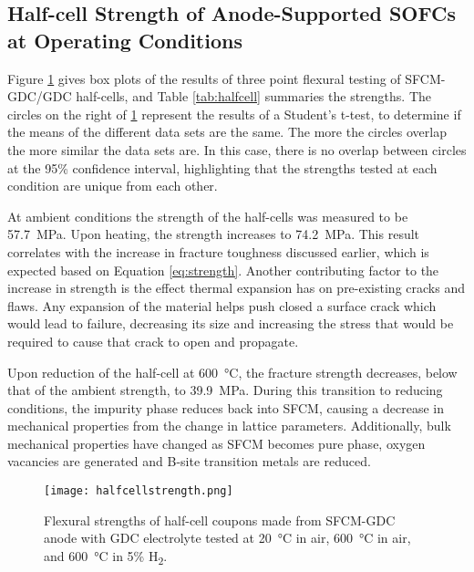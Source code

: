     \subsection{Half-cell Strength of Anode-Supported SOFCs at Operating Conditions}
        Figure \ref{fig:InSituBox} gives box plots of the results of three point flexural testing of SFCM-GDC/GDC half-cells, and Table \ref{tab:halfcell} summaries the strengths.
        The circles on the right of \ref{fig:InSituBox} represent the results of a Student's t-test, to determine if the means of the different data sets are the same.
        The more the circles overlap the more similar the data sets are.
        In this case, there is no overlap between circles at the 95\% confidence interval, highlighting that the strengths tested at each condition are unique from each other.

        At ambient conditions the strength of the half-cells was measured to be \SI{57.7}{\mega\pascal}.
        Upon heating, the strength increases to \SI{74.2}{\mega\pascal}.
        This result correlates with the increase in fracture toughness discussed earlier, which is expected based on Equation \ref{eq:strength}.
        Another contributing factor to the increase in strength is the effect thermal expansion has on pre-existing cracks and flaws.
        Any expansion of the material helps push closed a surface crack which would lead to failure, decreasing its size and increasing the stress that would be required to cause that crack to open and propagate.

        Upon reduction of the half-cell at \SI{600}{\celsius}, the fracture strength decreases, below that of the ambient strength, to \SI{39.9}{\mega\pascal}.
        During this transition to reducing conditions, the impurity phase reduces back into SFCM, causing a decrease in mechanical properties from the change in lattice parameters.
        Additionally, bulk mechanical properties have changed as SFCM becomes pure phase, oxygen vacancies are generated and B-site transition metals are reduced.

        \begin{figure}
          \texttt{[image: halfcellstrength.png]}
          \caption{Flexural strengths of half-cell coupons made from SFCM-GDC anode with GDC electrolyte tested at \SI{20}{\celsius} in air, \SI{600}{\celsius} in air, and \SI{600}{\celsius} in 5\% H\textsubscript{2}.}
          \label{fig:InSituBox}
        \end{figure}


